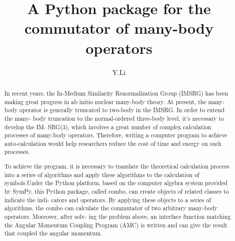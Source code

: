 \documentclass[final,3p,times]{elsarticle}
\begin{document}
\begin{frontmatter}




\title{A Python package for the commutator of many-body operators}



\author[a]{Y.Li}

\address[a]{Address XXXX}

\begin{abstract}

In recent years, the In-Medium Similarity Renormalization Group (IMSRG) has been
making great progress in ab initio nuclear many-body theory. At present, the many-body
operator is generally truncated to two-body in the IMSRG. In order to extend the many-
body truncation to the normal-ordered three-body level, it’s necessary to develop the IM-
SRG(3), which involves a great number of complex calculation processes of many-body
operators. Therefore, writing a computer program to achieve auto-calculation would help
researchers reduce the cost of time and energy on such processes.

To achieve the program, it is necessary to translate the theoretical calculation process
into a series of algorithms and apply these algorithms to the calculation of symbols.Under
the Python platform, based on the computer algebra system provided by SymPy, this
Python package, called combo, can create objects of related classes to indicate the indi-
cators and operators. By applying these objects to a series of algorithms, the combo can
calculate the commutator of two arbitrary many-body operators. Moreover, after solv-
ing the problem above, an interface function matching the Angular Momentum Coupling
Program (AMC) is written and can give the result that coupled the angular momentum.


\end{abstract}
\end{frontmatter}
\end{document}
